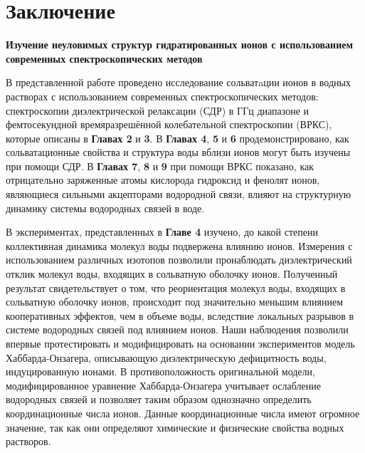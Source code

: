 
\chapter*{Заключение}


\begin{center}
	\textcolor{SchoolColor}{\Titulosize\bfseries Изучение неуловимых структур гидратированных ионов с использованием современных спектроскопических методов} \normalsize \\
	\vspace*{9pt}
\end{center}




В представленной работе проведено исследование сольватaции ионов в водных растворах с использованием современных спектроскопических методов: спектроскопии диэлектрической релаксации (СДР) в ГГц диапазоне и фемтосекундной времяразрешённой колебательной спектроскопии (ВРКС), которые описаны в \textbf{Главах 2} и \textbf{3}. В \textbf{Главах 4}, \textbf{5} и \textbf{6} продемонстрировано, как сольватационные свойства и структура воды вблизи ионов могут быть изучены при помощи СДР. В \textbf{Главах 7}, \textbf{8} и \textbf{9} при помощи ВРКС показано, как отрицательно заряженные атомы кислорода гидроксид и фенолят ионов, являющиеся сильными акцепторами водородной связи, влияют на структурную динамику системы водородных связей в воде. 

В экспериментах, представленных в \textbf{Главе 4} изучено, до какой степени коллективная динамика молекул воды подвержена влиянию ионов. Измерения с использованием различных изотопов позволили пронаблюдать диэлектрический отклик молекул воды, входящих в сольватную оболочку ионов. Полученный результат свидетельствует о том, что реориентация молекул воды, входящих в сольватную оболочку ионов, происходит под значительно меньшим влиянием кооперативных эффектов, чем в объеме воды, вследствие локальных разрывов в системе водородных связей под влиянием ионов. Наши наблюдения позволили впервые протестировать и модифицировать на основании экспериментов модель Хаббарда-Онзагера, описывающую диэлектрическую дефицитность воды, индуцированную ионами. В противоположность оригинальной модели, модифицированное уравнение Хаббарда-Онзагера учитывает ослабление водородных связей и позволяет таким образом однозначно определить координационные числа ионов. Данные координационные числа имеют огромное значение, так как они определяют химические и физические свойства водных растворов.


